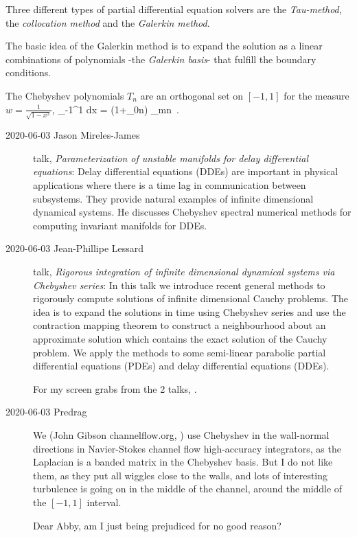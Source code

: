 Three different types of partial differential equation
solvers are  the {\em Tau-method}, the {\em collocation
method} and the {\em Galerkin method}.

The basic idea of the Galerkin method is to expand the solution as a
linear combinations of polynomials -the {\em Galerkin basis}- that fulfill
the boundary conditions.

The Chebyshev polynomials $T_n$ are an orthogonal set on $[-1,1]$ for the measure
$w = \frac{1}{\sqrt{1-x^2}}$,
\beq
\int_{-1}^1  {\rm d}x
   = (1+\delta_{0n}) \delta_{mn}
   \,.

\bigskip

\begin{description}
\item[2020-06-03 Jason Mireles-James]
{talk},
{\em Parameterization of unstable manifolds for delay differential equations}:
Delay differential equations (DDEs) are important in physical
applications where there is a time lag in communication between
subsystems. They provide natural examples of infinite
dimensional dynamical systems.  He discusses Chebyshev spectral numerical
methods for computing invariant manifolds for DDEs.

\item[2020-06-03 Jean-Phillipe Lessard]
{talk},
{\em Rigorous integration of infinite
dimensional dynamical systems via Chebyshev series}: In this talk we
introduce recent general methods to rigorously compute solutions of
infinite dimensional Cauchy problems. The idea is to expand the solutions
in time using Chebyshev series and use the contraction mapping theorem to
construct a neighbourhood about an approximate solution which contains
the exact solution of the Cauchy problem. We apply the methods to some
semi-linear parabolic partial differential equations (PDEs) and delay
differential equations (DDEs).

For my screen grabs from the 2 talks,
.

\item[2020-06-03 Predrag] We (John Gibson 
{channelflow.org}, \etc) use Chebyshev in the
wall-normal directions in Navier-Stokes channel flow high-accuracy
integrators, as the Laplacian is a banded matrix in the Chebyshev basis.
But I do not like them, as they put all wiggles close to the walls, and
lots of interesting turbulence is going on in the middle of the channel,
around the middle of the $[-1,1]$ interval.

Dear Abby, am I just being prejudiced for no good reason?

\end{description}
